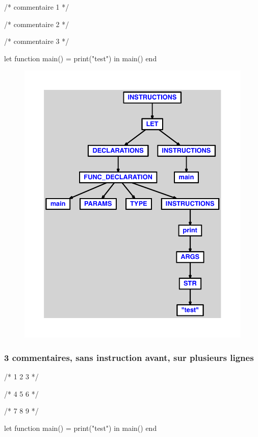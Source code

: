 \documentclass{article}
\begin{document}
\begin{verbatimtab}
/* commentaire 1 */

/* commentaire 2 */

/* commentaire 3 */

let
	function main() = print("test")
in main() end
\end{verbatimtab}
\begin{figure}[H]\centering\includegraphics[max width=\textwidth]{ast/ast_158.pdf}\end{figure}\subsubsection{3 commentaires, sans instruction avant, sur plusieurs lignes}
\begin{verbatimtab}
/*
1
2
3
*/

/*
4
5
6
*/

/*
7
8
9
*/

let
	function main() = print("test")
in main() end
\end{verbatimtab}
\end{document}
